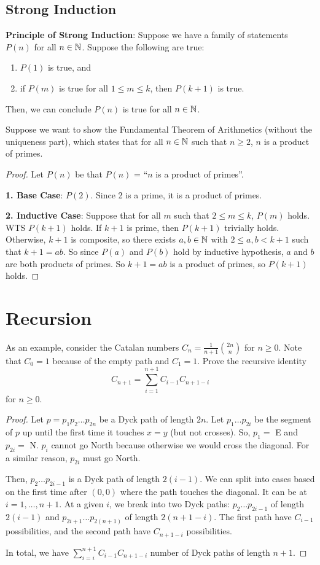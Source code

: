 \subsection{Strong Induction}

\textbf{Principle of Strong Induction}: Suppose we have a family of statements $P(n)$ for all $n \in \mathbb{N}$. Suppose the following are true:
\begin{enumerate}
    \item $P(1)$ is true, and
    \item if $P(m)$ is true for all $1 \leq m \leq k$, then $P(k+1)$ is true.
\end{enumerate}
Then, we can conclude $P(n)$ is true for all $n \in \mathbb{N}$.

Suppose we want to show the Fundamental Theorem of Arithmetics (without the uniqueness part), which states that for all $n \in \mathbb{N}$ such that $n \geq 2$, $n$ is a product of primes.

\begin{proof}
    Let $P(n)$ be that $P(n)$ = ``$n$ is a product of primes''.

    \textbf{1. Base Case}: $P(2)$. Since 2 is a prime, it is a product of primes.

    \textbf{2. Inductive Case}: Suppose that for all $m$ such that $2 \leq m \leq k$, $P(m)$ holds. WTS $P(k+1)$ holds. If $k+1$ is prime, then $P(k+1)$ trivially holds. Otherwise, $k+1$ is composite, so there exists $a,b \in \mathbb{N}$ with $2 \leq a,b < k+1$ such that $k+1 = ab$. So since $P(a)$ and $P(b)$ hold by inductive hypothesis, $a$ and $b$ are both products of primes. So $k+1 = ab$ is a product of primes, so $P(k+1)$ holds.
\end{proof}

\section{Recursion}

As an example, consider the Catalan numbers $C_n = \frac{1}{n+1} \binom{2n}{n}$ for $n \geq 0$. Note that $C_0 = 1$ because of the empty path and $C_1 = 1$. Prove the recursive identity
$$
C_{n+1} = \sum_{i=1}^{n+1} C_{i-1} C_{n+1-i}
$$
for $n \geq 0$.

\begin{proof}
    Let $p = p_1p_2\ldots p_{2n}$ be a Dyck path of length $2n$. Let $p_1\ldots p_{2i}$ be the segment of $p$ up until the first time it touches $x=y$ (but not crosses). So, $p_1=$ E and $p_{2i}=$ N. $p_i$ cannot go North because otherwise we would cross the diagonal. For a similar reason, $p_{2i}$ must go North.

    Then, $p_2\ldots p_{2i-1}$ is a Dyck path of length $2(i-1)$. We can split into cases based on the first time after $(0,0)$ where the path touches the diagonal. It can be at $i = 1,\ldots,n+1$. At a given $i$, we break into two Dyck paths: $p_2 \ldots p_{2i-1}$ of length $2(i-1)$ and $p_{2i+1}\ldots p_{2(n+1)}$ of length $2(n+1-i)$. The first path have $C_{i-1}$ possibilities, and the second path have $C_{n+1-i}$ possibilities.

    In total, we have $\sum_{i=i}^{n+1} C_{i-1} C_{n+1-i}$ number of Dyck paths of length $n+1$.
\end{proof}

